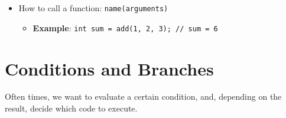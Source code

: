 \documentclass{article}
\begin{document}
\begin{itemize}
	\begin{itemize}
		\item \textbf{type}: The return type of the function (can be \texttt{void})
		\item \textbf{name}: The function's name
		\item \textbf{arguments}: The input arguments to a function
		\begin{itemize}
			\item Specified as \textbf{type name} in a comma seperated list
			\item \textbf{Example}: \texttt{int add(int a, int b, int c) \{...\}}
		\end{itemize}
		\item Together, the function's name and arguments make up the signature
	\end{itemize}
	\item How to call a function: \texttt{name(arguments)}
	\begin{itemize}
	\item \textbf{Example}: \texttt{int sum = add(1, 2, 3); // sum = 6}
	\end{itemize}
	
\end{itemize}

\section{Conditions and Branches}

\noindent
Often times, we want to evaluate a certain condition, and, depending on the result, decide which code to execute.
\end{document}
